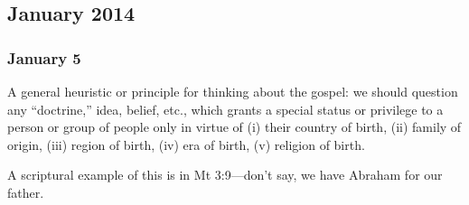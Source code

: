 \subsection{January 2014}

\subsubsection{January 5}

A general heuristic or principle for thinking about the gospel: we should question any ``doctrine,'' idea, belief, etc., which grants a special status or privilege to a person or group of people only in virtue of (i) their country of birth, (ii) family of origin, (iii) region of birth, (iv) era of birth, (v) religion of birth.

A scriptural example of this is in Mt 3:9---don't say, we have Abraham for our father.